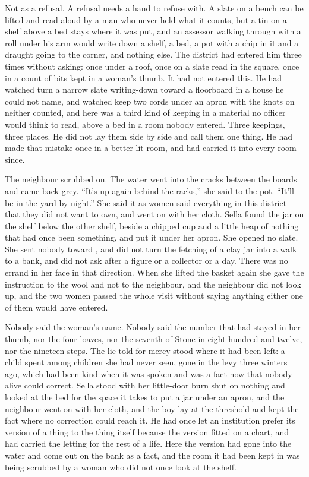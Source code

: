 Not as a refusal. A refusal needs a hand to refuse with. A slate on a bench can be lifted and read aloud by a man who never held what it counts, but a tin on a shelf above a bed stays where it was put, and an assessor walking through with a roll under his arm would write down a shelf, a bed, a pot with a chip in it and a draught going to the corner, and nothing else. The district had entered him three times without asking: once under a roof, once on a slate read in the square, once in a count of bits kept in a woman's thumb. It had not entered this. He had watched  turn a narrow slate writing-down toward a floorboard in a house he could not name, and watched  keep two cords under an apron with the knots on neither counted, and here was a third kind of keeping in a material no officer would think to read, above a bed in a room nobody entered. Three keepings, three places. He did not lay them side by side and call them one thing. He had made that mistake once in a better-lit room, and had carried it into every room since.

The neighbour scrubbed on. The water went into the cracks between the boards and came back grey. “It's up again behind the racks,” she said to the pot. “It'll be in the yard by night.” She said it as women said everything in this district that they did not want to own, and went on with her cloth. Sella found the jar on the shelf below the other shelf, beside a chipped cup and a little heap of nothing that had once been something, and put it under her apron. She opened no slate. She sent nobody toward , and did not turn the fetching of a clay jar into a walk to a bank, and did not ask after a figure or a collector or a day. There was no errand in her face in that direction. When she lifted the basket again she gave the instruction to the wool and not to the neighbour, and the neighbour did not look up, and the two women passed the whole visit without saying anything either one of them would have entered.

Nobody said the woman's name. Nobody said the number that had stayed in her thumb, nor the four loaves, nor the seventh of Stone in eight hundred and twelve, nor the nineteen steps. The lie told for mercy stood where it had been left: a child spent among children she had never seen, gone in the levy three winters ago, which had been kind when it was spoken and was a fact now that nobody alive could correct. Sella stood with her little-door burn shut on nothing and looked at the bed for the space it takes to put a jar under an apron, and the neighbour went on with her cloth, and the boy lay at the threshold and kept the fact where no correction could reach it. He had once let an institution prefer its version of a thing to the thing itself because the version fitted on a chart, and had carried the letting for the rest of a life. Here the version had gone into the water and come out on the bank as a fact, and the room it had been kept in was being scrubbed by a woman who did not once look at the shelf.

